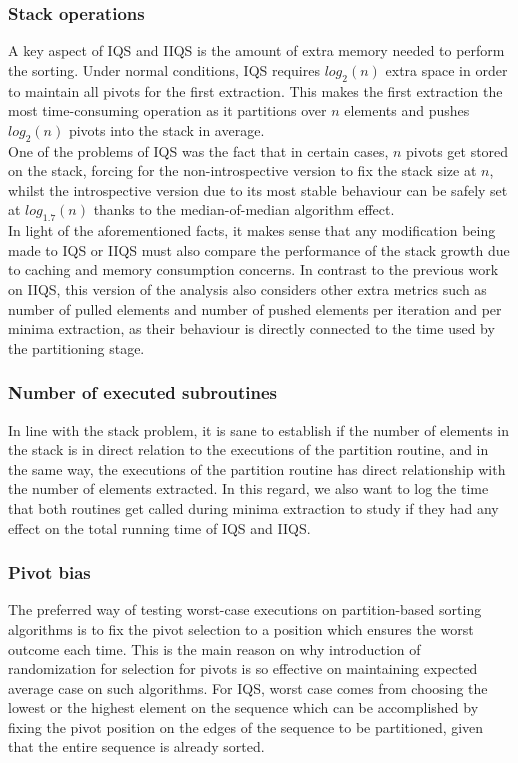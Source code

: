 \subsubsection{Stack operations}
A key aspect of IQS and IIQS is the amount of extra memory needed to perform the sorting. Under normal conditions, IQS requires $log_2(n)$ extra space in order to maintain all pivots for the first extraction. This makes the first extraction the most time-consuming operation as it partitions over $n$ elements and pushes $log_2(n)$ pivots into the stack in average.\\

One of the problems of IQS was the fact that in certain cases, $n$ pivots get stored on the stack, forcing for the non-introspective version to fix the stack size at $n$, whilst the introspective version due to its most stable behaviour can be safely set at $log_{1.7}(n)$ thanks to the median-of-median algorithm effect.\\

In light of the aforementioned facts, it makes sense that any modification being made to IQS or IIQS must also compare the performance of the stack growth due to caching and memory consumption concerns. In contrast to the previous work on IIQS, this version of the analysis also considers other extra metrics such as number of pulled elements and number of pushed elements per iteration and per minima extraction, as their behaviour is directly connected to the time used by the partitioning stage.\\

\subsubsection{Number of executed subroutines}
In line with the stack problem, it is sane to establish if the number of elements in the stack is in direct relation to the executions of the partition routine, and in the same way, the executions of the partition routine has direct relationship with the number of elements extracted. In this regard, we also want to log the time that both routines get called during minima extraction to study if they had any effect on the total running time of IQS and IIQS.\\

\subsubsection{Pivot bias}
The preferred way of testing worst-case executions on partition-based sorting algorithms is to fix the pivot selection to a position which ensures the worst outcome each time. This is the main reason on why introduction of randomization for selection for pivots is so effective on maintaining expected average case on such algorithms. For IQS, worst case comes from choosing the lowest or the highest element on the sequence which can be accomplished by fixing the pivot position on the edges of the sequence to be partitioned, given that the entire sequence is already sorted.\\

